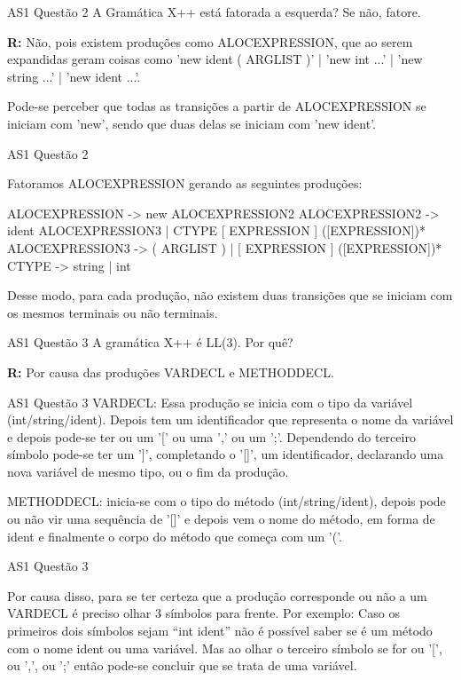 \documentclass[10pt]{beamer}
\begin{document}
\begin{frame}{AS1 Questão 2}
    A Gramática X++ está fatorada a esquerda? Se não, fatore.

    \textbf{R:} Não, pois existem produções como ALOCEXPRESSION, que ao serem
    expandidas geram coisas como 'new ident ( ARGLIST )' | 'new int ...' | 
    'new string ...' | 'new ident ...'.

    Pode-se perceber que todas as transições a partir de ALOCEXPRESSION se
    iniciam com 'new', sendo que duas delas se iniciam com 'new ident'.
\end{frame}

\begin{frame}{AS1 Questão 2}
    
    Fatoramos ALOCEXPRESSION gerando as seguintes produções:

    ALOCEXPRESSION -> new ALOCEXPRESSION2
    ALOCEXPRESSION2 -> ident ALOCEXPRESSION3 | CTYPE [ EXPRESSION ] ([EXPRESSION])*
    ALOCEXPRESSION3 -> ( ARGLIST ) | [ EXPRESSION ] ([EXPRESSION])*
    CTYPE -> string | int

    Desse modo, para cada produção, não existem duas transições que se iniciam
    com os mesmos terminais ou não terminais.

\end{frame}

\begin{frame}{AS1 Questão 3}
    A gramática X++ é LL(3). Por quê?

    \textbf{R:} Por causa das produções VARDECL e METHODDECL.

\end{frame}

\begin{frame}{AS1 Questão 3}
    VARDECL: Essa produção se inicia com o tipo da variável (int/string/ident).
    Depois tem um identificador que representa o nome da variável e depois
    pode-se ter ou um '[' ou uma ',' ou um ';'. Dependendo do terceiro símbolo
    pode-se ter um ']', completando o '[]', um identificador, declarando uma
    nova variável de mesmo tipo, ou o fim da produção.

    METHODDECL: inicia-se com o tipo do método (int/string/ident), depois pode
    ou não vir uma sequência de '[]' e depois vem o nome do método, em forma de
    ident e finalmente o corpo do método que começa com um '('.

\end{frame}

\begin{frame}{AS1 Questão 3}

    Por causa disso, para se ter certeza que a produção corresponde ou não a um
    VARDECL é preciso olhar 3 símbolos para frente. Por exemplo: Caso os
    primeiros dois símbolos sejam ``int ident'' não é possível saber se é um
    método com o nome ident ou uma variável. Mas ao olhar o terceiro símbolo se
    for ou '[', ou ',', ou ';' então pode-se concluir que se trata de uma
    variável.

\end{frame}
\end{document}
